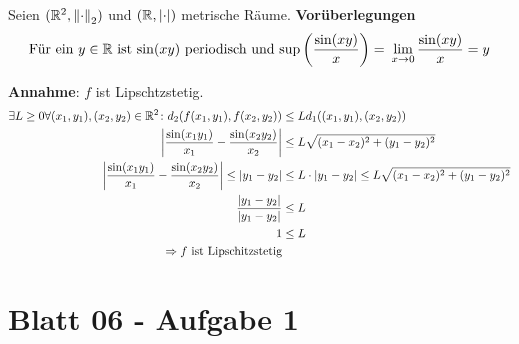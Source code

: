 \documentclass{scrreprt}
\begin{document}
Seien $(\mathbb{R}^2, \norm{\cdot}_2)$ und $(\mathbb{R}, \abs{\cdot})$
metrische Räume. \textbf{Vorüberlegungen}
\[
  \text{Für ein $y \in \mathbb{R}$ ist $\sin(xy)$ periodisch und $\sup\qty(\frac{\sin(xy)}{x}) = $ }
  \lim_{x \to 0} \frac{\sin(xy)}{x} = y
\]

\textbf{Annahme}: $f$ ist Lipschtzstetig.
\begin{align*}
  \exists L \geq 0 \forall (x_1, y_1), (x_2, y_2) \in \mathbb{R}^2 \colon d_2(f(x_1, y_1), f(x_2, y_2))
    &\leq L d_1((x_1, y_1), (x_2, y_2)) \\
  \abs{\frac{\sin(x_1y_1)}{x_1} - \frac{\sin(x_2y_2)}{x_2}}
    &\leq L \sqrt{(x_1 - x_2)^2 + (y_1 - y_2)^2} \\
  \abs{\frac{\sin(x_1y_1)}{x_1} - \frac{\sin(x_2y_2)}{x_2}}
    \leq \abs{y_1 - y_2} &\leq L \cdot \abs{y_1 - y_2}
    \leq L\sqrt{(x_1 - x_2)^2 + (y_1 - y_2)^2} \\
  \frac{\abs{y_1 - y_2}}{\abs{y_1 - y_2}} &\leq L \\
  1 &\leq L \\
  \Rightarrow f \text{ ist Lipschitzstetig}
\end{align*}

\section{Blatt 06 - Aufgabe 1}
\end{document}

